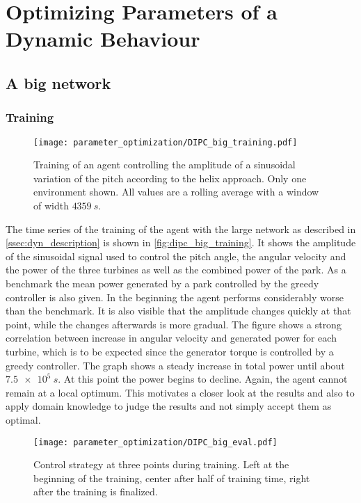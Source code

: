 \section{Optimizing Parameters of a Dynamic Behaviour}
\subsection{A big network}
\subsubsection{Training}
\begin{figure}[h]
	\centering
	\texttt{[image: parameter\_optimization/DIPC\_big\_training.pdf]}
	\caption{ Training of an agent controlling the amplitude of a sinusoidal variation of the pitch according to the helix approach. Only one environment shown. All values are a rolling average with a window of width $\SI{4359}{s}$. }
	\label{fig:dipc_big_training}
\end{figure}
The time series of the training of the agent with the large network as described in \autoref{ssec:dyn_description} is shown in \autoref{fig:dipc_big_training}. It shows the amplitude of the sinusoidal signal used to control the pitch angle, the angular velocity and the power of the three turbines as well as the combined power of the park. As a benchmark the mean power generated by a park controlled by the greedy controller is also given. In the beginning the agent performs considerably worse than the benchmark. It is also visible that the amplitude changes quickly at that point, while the changes afterwards is more gradual. The figure shows a strong correlation between increase in angular velocity and generated power for each turbine, which is to be expected since the generator torque is controlled by a greedy controller. The graph shows a steady increase in total power until about $\SI{7.5e5}{s}$. At this point the power begins to decline. Again, the agent cannot remain at a local optimum. This motivates a closer look at the results and also to apply domain knowledge to judge the results and not simply accept them as optimal. \\
\begin{figure}[h]
	\centering
	\texttt{[image: parameter\_optimization/DIPC\_big\_eval.pdf]}
	\caption{ Control strategy at three points during training. Left at the beginning of the training, center after half of training time, right after the training is finalized.}
	\label{fig:dipc_big_strategies}
\end{figure}
